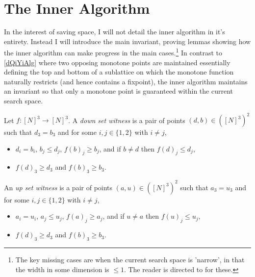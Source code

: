 \section{The Inner Algorithm} \label{innerAlgChap}
In the interest of saving space, I will not detail the inner algorithm in it's entirety.
Instead I will introduce
the main invariant, proving lemmas showing how the inner algorithm
can make progress in the main cases.\footnote{The key missing cases are when the current search space is 'narrow',
in that the width in some dimension is $\leq 1$.
The reader is directed to \citep{fasterTarski} for these.} In contrast to
\cref{dQiYiAlg} where two opposing monotone points are maintained essentially
defining the top and bottom of a sublattice on which the monotone function
naturally restricts (and hence contains a fixpoint), 
the inner algorithm maintains an invariant so that only a monotone point is guaranteed
within the current search space.
\begin{definition} \label{witnessDef}
  Let $f : [N]^3 \to [N]^3$. A \emph{down set witness} is a pair of points
  $(d, b) \in ([N]^3)^2$ such that $d_3 = b_3$ and for some $i, j \in \{1, 2\}$
  with $i \neq j$,
  \begin{itemize}
    \item $d_i = b_i$, $b_j \leq d_j$, $f(b)_j \geq b_j$, and if $b \neq d$ then $f(d)_j \leq d_j$,
    \item $f(d)_3 \geq d_3$ and $f(b)_3 \geq b_3$.
  \end{itemize}
  An \emph{up set witness} is a pair of points
  $(a, u) \in ([N]^3)^2$ such that $a_3 = u_3$ and for some $i, j \in \{1, 2\}$
  with $i \neq j$,
  \begin{itemize}
    \item $a_i = u_i$, $a_j \leq u_j$, $f(a)_j \geq a_j$, and if $u \neq a$ then $f(u)_j \leq u_j$,
    \item $f(d)_3 \geq d_3$ and $f(b)_3 \geq b_3$.
  \end{itemize}
\end{definition}

